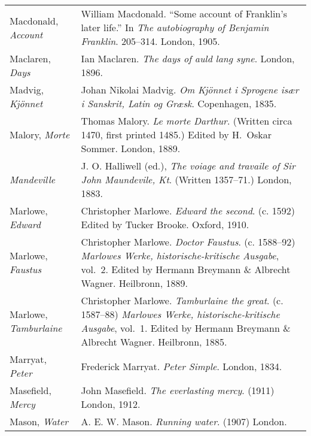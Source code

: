 \begin{longtable}{p{} p{}}
Macdonald, \textit{Account} & William Macdonald. ``Some account of Frank\-lin's later life.'' In \textit{The autobiography of Benjamin Franklin}. 205--314. London, 1905. \\

Maclaren, \textit{Days} & Ian Maclaren. \textit{The days of auld lang syne}. London, 1896. \\ %

Madvig, \textit{Kjönnet} & Johan Nikolai Madvig. \textit{Om Kjönnet i Sprogene især i Sanskrit, Latin og Græsk}. Copenhagen, 1835. \\

Malory, \textit{Morte} & Thomas Malory. \textit{Le morte Darthur}. (Written circa 1470, first printed 1485.) Edited by H.~Oskar Sommer. London, 1889. \\

\textit{Mandeville} & J. O. Halliwell (ed.), \textit{The voiage and travaile of Sir John Maundevile, Kt}. (Written 1357--71.) London, 1883. \\

Marlowe, \textit{Edward} & Christopher Marlowe. \textit{Edward the second}. (c. 1592) Edited by Tucker Brooke. Oxford, 1910. \\
Marlowe, \textit{Faustus} & Christopher Marlowe. \textit{Doctor Faustus}. (c. 1588--92) \textit{Marlowes Werke, historische-kritische Ausgabe}, vol.~2. Edited by Hermann Breymann \& Albrecht Wagner. Heilbronn, 1889. \\
Marlowe, \textit{Tamburlaine} & Christopher Marlowe. \textit{Tamburlaine the great}. (c. 1587--88) \textit{Marlowes Werke, historische-kritische Ausgabe}, vol.~1. Edited by Hermann Breymann \& Albrecht Wagner. Heilbronn, 1885. \\

Marryat, \textit{Peter} & Frederick Marryat. \textit{Peter Simple}. London, 1834. \\

Masefield, \textit{Mercy} & John Masefield. \textit{The everlasting mercy}. (1911) London, 1912. \\

Mason, \textit{Water} & A. E. W. Mason. \textit{Running water}. (1907) London. \\


\end{longtable}
